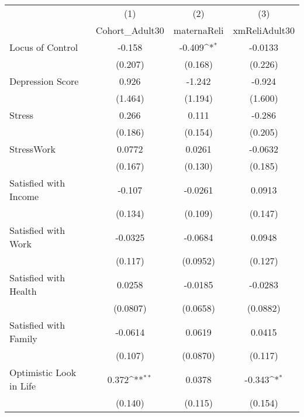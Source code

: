 {
\def\sym#1{\ifmmode^{#1}\else\(^{#1}\)\fi}
\begin{tabular}{l*{3}{c}}
\hline\hline
            &\multicolumn{1}{c}{(1)}&\multicolumn{1}{c}{(2)}&\multicolumn{1}{c}{(3)}\\
            &\multicolumn{1}{c}{Cohort\_Adult30}&\multicolumn{1}{c}{maternaReli}&\multicolumn{1}{c}{xmReliAdult30}\\
\hline
Locus of Control&      -0.158         &      -0.409\sym{*}  &     -0.0133         \\
            &     (0.207)         &     (0.168)         &     (0.226)         \\
[1em]
Depression Score&       0.926         &      -1.242         &      -0.924         \\
            &     (1.464)         &     (1.194)         &     (1.600)         \\
[1em]
Stress      &       0.266         &       0.111         &      -0.286         \\
            &     (0.186)         &     (0.154)         &     (0.205)         \\
[1em]
StressWork  &      0.0772         &      0.0261         &     -0.0632         \\
            &     (0.167)         &     (0.130)         &     (0.185)         \\
[1em]
Satisfied with Income&      -0.107         &     -0.0261         &      0.0913         \\
            &     (0.134)         &     (0.109)         &     (0.147)         \\
[1em]
Satisfied with Work&     -0.0325         &     -0.0684         &      0.0948         \\
            &     (0.117)         &    (0.0952)         &     (0.127)         \\
[1em]
Satisfied with Health&      0.0258         &     -0.0185         &     -0.0283         \\
            &    (0.0807)         &    (0.0658)         &    (0.0882)         \\
[1em]
Satisfied with Family&     -0.0614         &      0.0619         &      0.0415         \\
            &     (0.107)         &    (0.0870)         &     (0.117)         \\
[1em]
Optimistic Look in Life&       0.372\sym{**} &      0.0378         &      -0.343\sym{*}  \\
            &     (0.140)         &     (0.115)         &     (0.154)         \\

\end{tabular}}
